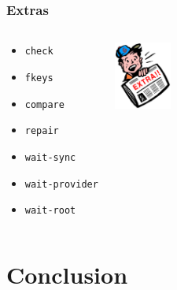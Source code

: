 \documentclass{beamer}
\begin{document}
\begin{frame}[fragile]
  \frametitle{Extras}

\begin{columns}[c]

  \begin{multicols}{2}
    \begin{itemize}
      \item \texttt{check}
      \item \texttt{fkeys}
      \item \texttt{compare}
      \item \texttt{repair}
      \item \texttt{wait-sync}
      \item \texttt{wait-provider}
      \item \texttt{wait-root}
    \end{itemize}
   \end{multicols}

\begin{center}
  \includegraphics[height=6em]{extra.jpg}
\end{center}
\end{columns}
\end{frame}

\section{Conclusion}

\end{document}
